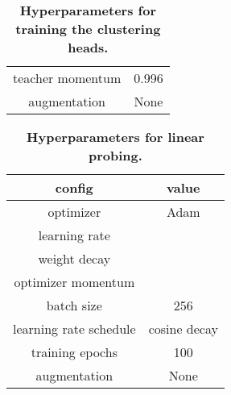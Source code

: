 \documentclass{bmvc2k}
\begin{document}
\begin{table}[b]
\begin{center}
\begin{tabular}{cc}
teacher momentum & 0.996 \\
augmentation & None \\
\bottomrule
\end{tabular}\end{center}
\caption{\textbf{Hyperparameters for training the clustering heads.}}
\end{table} \begin{table}[b]
\label{tab:finetune-hp} 
\begin{center}
\begin{tabular}{cc}
\toprule
config & value \\
\hline
optimizer & Adam \\
learning rate &  \\
weight decay &  \\
optimizer momentum &  \\
batch size & 256 \\
learning rate schedule & cosine decay \\
training epochs & 100 \\
augmentation & None \\
\bottomrule
\end{tabular}
\end{center}
\caption{\textbf{Hyperparameters for linear probing.}}
\end{table} 
\end{document}
